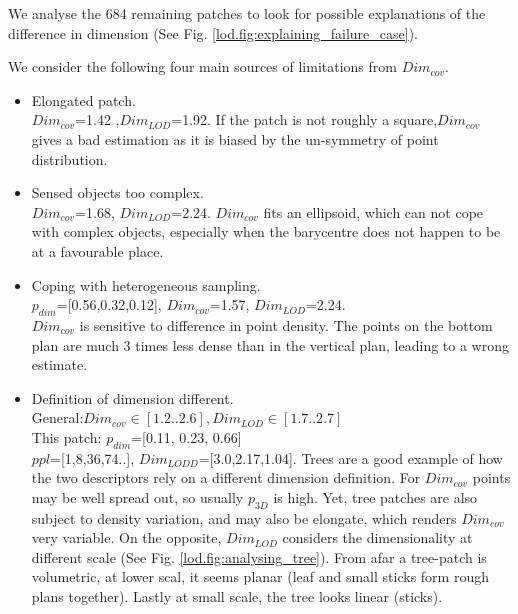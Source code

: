 		
		
		We analyse the 684 remaining patches to look for possible explanations of the difference in dimension (See Fig. \ref{lod.fig:explaining_failure_case}).
		
		We consider the following four main sources of limitations from $Dim_{cov}$.
		\begin{itemize}%
			\item Elongated patch.\\
				$Dim_{cov}$=1.42
				,$Dim_{LOD}$=1.92. 
				If the patch is not roughly a square,$Dim_{cov}$ gives a bad estimation as it is biased by the un-symmetry of point distribution.
			\item Sensed objects too complex.\\
				$Dim_{cov}$=1.68,
				$Dim_{LOD}$=2.24.
				$Dim_{cov}$ fits an ellipsoid, which can not cope with complex objects, especially when the barycentre does not happen to be at a favourable place. 
			\item Coping with heterogeneous sampling.\\
				$p_{dim}$=[0.56,0.32,0.12],
				$Dim_{cov}$=1.57,
				$Dim_{LOD}$=2.24.\\
				$Dim_{cov}$ is sensitive to difference in point density. The points on the bottom plan are much 3 times less dense than in the vertical plan, leading to a wrong estimate.
			\item Definition of dimension different.\\
				General:$Dim_{cov}\in[1.2..2.6],Dim_{LOD}\in[1.7..2.7]$\\
				This patch: $p_{dim}$=[0.11, 0.23, 0.66]\\
				$ppl$=[1,8,36,74..],
				$Dim_{LODD}$=[3.0,2.17,1.04].
				Trees are a good example of how the two descriptors rely on a different dimension definition. For $Dim_{cov}$ points may be well spread out, so usually $p_{3D}$ is high.
				Yet, tree patches are also subject to density variation, and may also be elongate, which renders $Dim_{cov}$ very variable.
				On the opposite, $Dim_{LOD}$ considers the dimensionality at different scale (See Fig. \ref{lod.fig:analysing_tree}). From afar a tree-patch is volumetric, at lower scal, it seems planar (leaf and small sticks form rough plans together). Lastly at small scale, the tree looks linear (sticks). 
		\end{itemize}
		 
